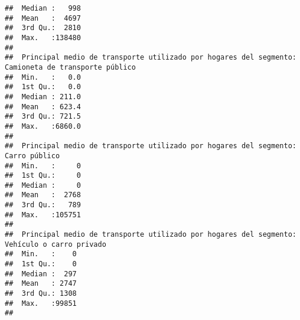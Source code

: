 \documentclass[11pt,]{article}
\begin{document}
\begin{verbatim}
##  Median :   998                                                                  
##  Mean   :  4697                                                                  
##  3rd Qu.:  2810                                                                  
##  Max.   :138480                                                                  
##                                                                                  
##  Principal medio de transporte utilizado por hogares del segmento: Camioneta de transporte público
##  Min.   :   0.0                                                                                   
##  1st Qu.:   0.0                                                                                   
##  Median : 211.0                                                                                   
##  Mean   : 623.4                                                                                   
##  3rd Qu.: 721.5                                                                                   
##  Max.   :6860.0                                                                                   
##                                                                                                   
##  Principal medio de transporte utilizado por hogares del segmento: Carro público
##  Min.   :     0                                                                 
##  1st Qu.:     0                                                                 
##  Median :     0                                                                 
##  Mean   :  2768                                                                 
##  3rd Qu.:   789                                                                 
##  Max.   :105751                                                                 
##                                                                                 
##  Principal medio de transporte utilizado por hogares del segmento: Vehículo o carro privado
##  Min.   :    0                                                                             
##  1st Qu.:    0                                                                             
##  Median :  297                                                                             
##  Mean   : 2747                                                                             
##  3rd Qu.: 1308                                                                             
##  Max.   :99851                                                                             
##                                                                                            

\end{verbatim}
\end{document}
